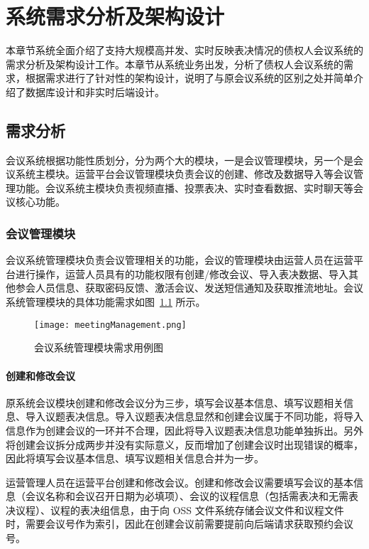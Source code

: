 
\chapter{系统需求分析及架构设计}
本章节系统全面介绍了支持大规模高并发、实时反映表决情况的债权人会议系统的需求分析及架构设计工作。本章节从系统业务出发，分析了债权人会议系统的需求，根据需求进行了针对性的架构设计，说明了与原会议系统的区别之处并简单介绍了数据库设计和非实时后端设计。

\section{需求分析}

会议系统根据功能性质划分，分为两个大的模块，一是会议管理模块，另一个是会议系统主模块。运营平台会议管理模块负责会议的创建、修改及数据导入等会议管理功能。会议系统主模块负责视频直播、投票表决、实时查看数据、实时聊天等会议核心功能。

\subsection{会议管理模块}

会议系统管理模块负责会议管理相关的功能，会议的管理模块由运营人员在运营平台进行操作，运营人员具有的功能权限有创建/修改会议、导入表决数据、导入其他参会人员信息、获取密码反馈、激活会议、发送短信通知及获取推流地址。会议系统管理模块的具体功能需求如图~\ref{fig:meetingManagement} 所示。

\begin{figure}[!htp]
  \centering
  \texttt{[image: meetingManagement.png]}
  \caption[管理模块]
    {会议系统管理模块需求用例图}
 \label{fig:meetingManagement}
\end{figure}

\subsubsection{创建和修改会议}
原系统会议模块创建和修改会议分为三步，填写会议基本信息、填写议题相关信息、导入议题表决信息。导入议题表决信息显然和创建会议属于不同功能，将导入信息作为创建会议的一环并不合理，因此将导入议题表决信息功能单独拆出。另外将创建会议拆分成两步并没有实际意义，反而增加了创建会议时出现错误的概率，因此将填写会议基本信息、填写议题相关信息合并为一步。

运营管理人员在运营平台创建和修改会议。创建和修改会议需要填写会议的基本信息（会议名称和会议召开日期为必填项）、会议的议程信息（包括需表决和无需表决议程）、议程的表决组信息，由于向 OSS 文件系统存储会议文件和议程文件时，需要会议号作为索引，因此在创建会议前需要提前向后端请求获取预约会议号。

